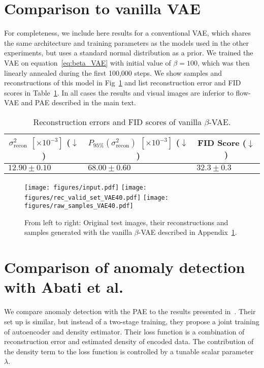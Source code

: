 \documentclass[10pt]{article} \usepackage[accepted]{tmlr}
\newcommand{\rev}[1]{{\color{black}#1}}
\begin{document}
\section{Comparison to vanilla VAE}
\label{sec:VanillaVAE}
\rev{For completeness, we include here results for a conventional VAE, which shares the same architecture and training parameters as the models used in the other experiments, but uses a standard normal distribution as a prior. We trained the VAE on equation~\ref{eq:beta_VAE} with initial value of $\beta=100$, which was then linearly annealed during the first 100,000 steps. We show samples and reconstructions of this model in Fig~\ref{fig:betaVAE} and list reconstruction error and FID scores in Table~\ref{tab:betaVAE}. In all cases the results and visual images are inferior to flow-VAE and PAE described in the main text. 
\begin{table}[h]
\begin{center}
\begin{tabular}{lll}
\multicolumn{1}{c|}{$\sigma_{\mathrm{recon}}^2$ $[\times10^{-3}]$ ($\downarrow$)}   &  \multicolumn{1}{c|}{$P_{95\%}(\sigma_{\mathrm{recon}}^2)$ $[\times10^{-3}]$ ($\downarrow$)}         & \multicolumn{1}{c}{FID Score ($\downarrow$)}\\ \hline
\multicolumn{1}{l|}{$12.90\pm0.10$} & \multicolumn{1}{l|}{$68.00\pm0.60$}       & \multicolumn{1}{l}{$32.3\pm0.3$}
\end{tabular}
\end{center}
\caption{\label{tab:betaVAE} Reconstruction errors and FID scores of vanilla $\beta$-VAE.}
\end{table}}
\begin{figure}
\begin{center}
\texttt{[image: figures/input.pdf]}
\texttt{[image: figures/rec\_valid\_set\_VAE40.pdf]}
\texttt{[image: figures/raw\_samples\_VAE40.pdf]}
\caption{From left to right: Original test images, their reconstructions and samples generated with the vanilla $\beta$-VAE described in Appendix~\ref{sec:VanillaVAE}.}
\label{fig:betaVAE}
\end{center}
\end{figure}

\section{Comparison of anomaly detection with Abati et al.}
\label{app:AbatiComparison}
We compare anomaly detection with the PAE to the results presented in~\citet{AbatiPCC19}. Their set up is similar, but instead of a two-stage training, they propose a joint training of autoencoder and density estimator. Their loss function is a combination of reconstruction error and estimated density of encoded data. The contribution of the density term to the loss function is controlled by a tunable scalar parameter $\lambda$.
\end{document}
